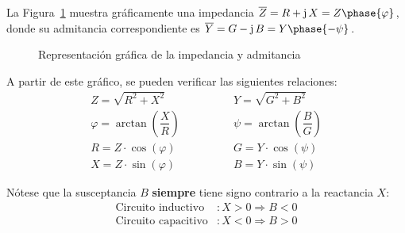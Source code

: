 La Figura~\ref{fig:impedancia_admitancia} muestra gráficamente una
impedancia $\overline{Z}=R+\mathrm{j}\,X=Z\phase{\varphi}$, donde su
admitancia correspondiente es
$\overline{Y}=G-\mathrm{j}\,B=Y\phase{-\psi}$.
\begin{figure}[H]
  \centering
  \hfil
  \caption{Representación gráfica de la impedancia y admitancia}
  \label{fig:impedancia_admitancia}
\end{figure}
A partir de este gráfico, se pueden verificar las siguientes
relaciones:
\begin{align*}
  Z=\sqrt{R^2+X^2}\qquad & \qquad Y=\sqrt{G^2+B^2}\\
  \varphi=\arctan\left(\dfrac{X}{R}\right)\qquad &  \qquad \psi=\arctan\left(\dfrac{B}{G}\right)\\
  R=Z\cdot \cos(\varphi)\qquad & \qquad G=Y\cdot \cos(\psi)\\
  X=Z\cdot \sin(\varphi)\qquad & \qquad B=Y\cdot \sin(\psi)
\end{align*}
	
\begin{remark}
  Nótese que la susceptancia $B$ \textbf{siempre} tiene signo
  contrario a la reactancia $X$:
  \begin{align*}
    \text{Circuito inductivo}&: X > 0 \Rightarrow B<0\\
    \text{Circuito capacitivo}&: X < 0 \Rightarrow B>0
  \end{align*}
\end{remark}
	
